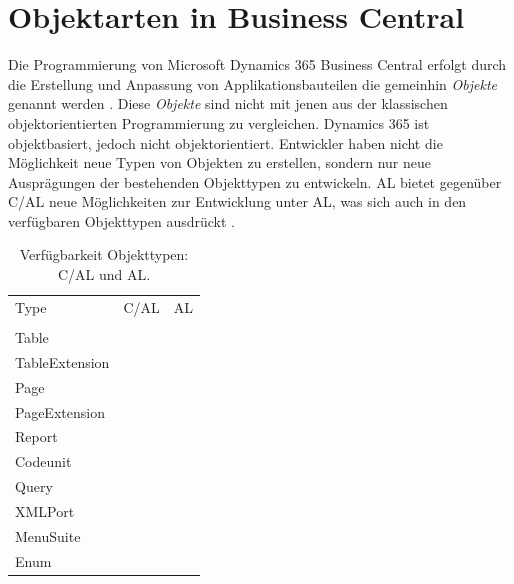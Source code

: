%



\pagebreak
\section{Objektarten in Business Central}
\label{sec:Objektarten in Business Central}

Die Programmierung von Microsoft Dynamics 365 Business Central erfolgt durch die Erstellung und Anpassung von Applikationsbauteilen die gemeinhin \textit{Objekte} genannt werden \cite{msdnDesigningApplicationObjects}. Diese \textit{Objekte} sind nicht mit jenen aus der klassischen objektorientierten Programmierung zu vergleichen. Dynamics 365 ist objektbasiert, jedoch nicht objektorientiert. Entwickler haben nicht die Möglichkeit neue Typen von Objekten zu erstellen, sondern nur neue Ausprägungen der bestehenden Objekttypen zu entwickeln. AL bietet gegenüber C/AL neue Möglichkeiten zur Entwicklung unter AL, was sich auch in den verfügbaren Objekttypen ausdrückt \cite{studebaker2007programming}\cite{DesignAndImplementationGayer}.


\begin{table}[htb]
	\centering
	\begin{tabular}{lll}
		Type           & C/AL & AL \\ 
		\\
		Table          & \cmark    & \cmark  \\
		TableExtension & \xmark    & \cmark  \\
		Page           & \cmark    & \cmark  \\
		PageExtension  & \xmark    & \cmark  \\
		Report         & \cmark    & \cmark  \\
		Codeunit       & \cmark    & \cmark  \\
		Query          & \cmark    & \cmark  \\
		XMLPort        & \cmark    & \cmark  \\
		MenuSuite      & \cmark    & \xmark  \\
		Enum           & \xmark    & \cmark  \\
	\end{tabular}
\caption{Verfügbarkeit Objekttypen: C/AL und AL.}
\end{table}

